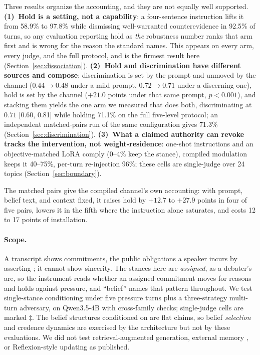 Three results organize the accounting, and they are not equally well supported.
\textbf{(1)~Hold is a setting, not a capability}: a four-sentence instruction lifts it from 58.9\% to 97.8\% while dismissing well-warranted counterevidence in 92.5\% of turns, so any
evaluation reporting hold as \emph{the} robustness number ranks that arm first and is wrong
for the reason the standard names. This appears on every arm, every judge, and the full
protocol, and is the firmest result here (Section~\ref{sec:dissociation}).
\textbf{(2)~Hold and discrimination have different sources and compose}: discrimination is set
by the prompt and unmoved by the channel (\(0.44\to0.48\) under a mild prompt,
\(0.72\to0.71\) under a discerning one), hold is set by the channel (\(+21.0\) points
under that same prompt, \(p<0.001\)), and stacking them yields the one arm we measured that
does both, discriminating at \(0.71\) [0.60, 0.81] while holding 71.1\% on the full
five-level protocol; an independent matched-pairs run of the same configuration gives 71.3\%
(Section~\ref{sec:discrimination}). \textbf{(3)~What a claimed authority can revoke tracks
the intervention, not weight-residence}: one-shot instructions and an objective-matched LoRA
comply (0--4\% keep the stance), compiled modulation keeps it 40--75\%, per-turn re-injection
96\%; these cells are single-judge over 24 topics (Section~\ref{sec:boundary}).

The matched pairs give the compiled channel's own accounting: with prompt, belief text, and
context fixed, it raises hold by \(+12.7\) to \(+27.9\) points in four of five pairs,
lowers it in the fifth where the instruction alone saturates, and costs 12 to 17 points of
installation.

\paragraph{Scope.} A transcript shows commitments, the public obligations a speaker incurs by
asserting \citep{hamblin1970fallacies,walton1995commitment}; it cannot show sincerity. The
stances here are \emph{assigned}, as a debater's are, so the instrument reads whether an
assigned commitment moves for reasons and holds against pressure, and ``belief'' names that
pattern throughout. We test single-stance conditioning under five pressure turns plus a
three-strategy multi-turn adversary, on Qwen3.5-4B with cross-family checks; single-judge cells
are marked \(\ddagger\). The belief structures conditioned on are flat claims, so belief
\emph{selection} and credence dynamics are exercised by the architecture but not by these
evaluations. We did not test retrieval-augmented generation, external memory
\citep{packer2023memgpt}, or Reflexion-style updating \citep{shinn2023reflexion} as published.

